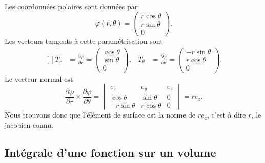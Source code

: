 \begin{example}
    Les coordonnées polaires sont données par
    \begin{equation}
        \varphi(r,\theta)=\begin{pmatrix}
            r\cos\theta    \\ 
            r\sin\theta    \\ 
            0    
        \end{pmatrix}.
    \end{equation}
    Les vecteurs tangents à cette paramétrisation sont
    \begin{equation}
        \begin{aligned}[]
            T_r&=\frac{ \partial \varphi }{ \partial r }=\begin{pmatrix}
                \cos\theta    \\ 
                \sin\theta    \\ 
                0    
            \end{pmatrix},&T_{\theta}&=\frac{ \partial \varphi }{ \partial \theta }=\begin{pmatrix}
                -r\sin\theta    \\ 
                r\cos\theta    \\ 
                0    
            \end{pmatrix}.
        \end{aligned}
    \end{equation}
    Le vecteur normal est
    \begin{equation}
        \frac{ \partial \varphi }{ \partial r }\times\frac{ \partial \varphi }{ \partial \theta }=\begin{vmatrix}
            e_x    &   e_y    &   e_z    \\
            \cos\theta    &   \sin\theta    &   0    \\
            -r\sin\theta    &   r\cos\theta    &   0
        \end{vmatrix}=re_z.
    \end{equation}
    Nous trouvons donc que l'élément de surface est la norme de $re_z$, c'est à dire $r$, le jacobien connu.
\end{example}

\subsection{Intégrale d'une fonction sur un volume}

